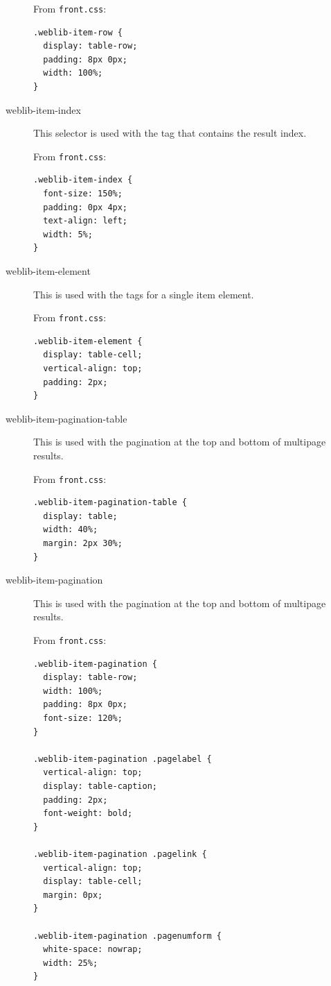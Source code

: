 \documentclass[letterpaper,twoside]{article}
\begin{document}
\begin{description}
From \texttt{front.css}:

\begin{verbatim}
.weblib-item-row {
  display: table-row;
  padding: 8px 0px;
  width: 100%;
}
\end{verbatim}

\item[weblib-item-index] This selector is used with the tag that contains the 
result index.

From \texttt{front.css}:

\begin{verbatim}
.weblib-item-index {
  font-size: 150%;
  padding: 0px 4px;
  text-align: left;
  width: 5%;
}
\end{verbatim}

\item[weblib-item-element] This is used with the tags for a single item 
element.

From \texttt{front.css}:

\begin{verbatim}
.weblib-item-element {
  display: table-cell;
  vertical-align: top;
  padding: 2px;
}
\end{verbatim}

\item[weblib-item-pagination-table] This is used with the pagination at the 
top and bottom of multipage results.

From \texttt{front.css}:

\begin{verbatim}
.weblib-item-pagination-table {
  display: table;
  width: 40%;
  margin: 2px 30%;
}
\end{verbatim}

\item[weblib-item-pagination] This is used with the pagination at the top and 
bottom of multipage results.

From \texttt{front.css}:

\begin{verbatim}
.weblib-item-pagination {
  display: table-row;
  width: 100%;
  padding: 8px 0px;
  font-size: 120%;
}

.weblib-item-pagination .pagelabel {
  vertical-align: top;
  display: table-caption;
  padding: 2px;
  font-weight: bold;  
}

.weblib-item-pagination .pagelink {
  vertical-align: top;
  display: table-cell;
  margin: 0px;
}

.weblib-item-pagination .pagenumform {
  white-space: nowrap;
  width: 25%;
}
\end{verbatim}


\end{description}
\end{document}
